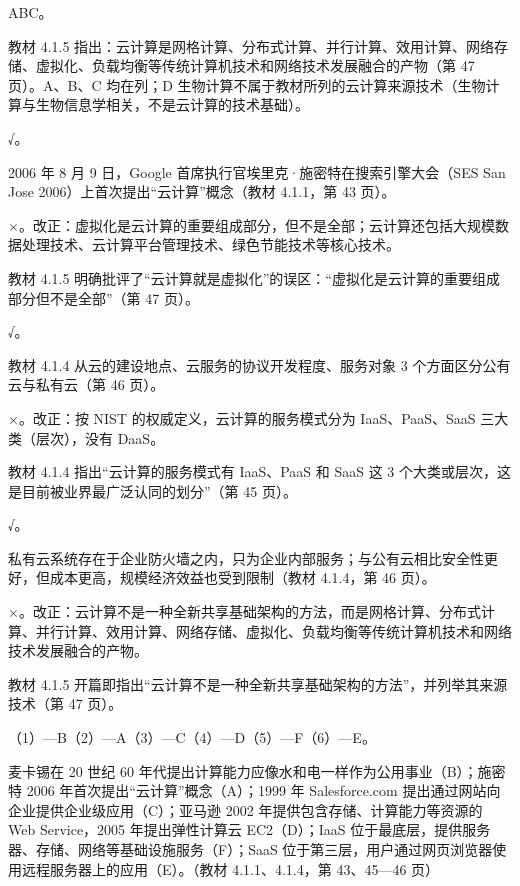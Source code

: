 \documentclass[a4paper,11pt]{article}
\begin{document}
\q ABC。\begin{analysis}教材 4.1.5 指出：云计算是网格计算、分布式计算、并行计算、效用计算、网络存储、虚拟化、负载均衡等传统计算机技术和网络技术发展融合的产物（第 47 页）。A、B、C 均在列；D 生物计算不属于教材所列的云计算来源技术（生物计算与生物信息学相关，不是云计算的技术基础）。\end{analysis}


\q √。\begin{analysis}2006 年 8 月 9 日，Google 首席执行官埃里克·施密特在搜索引擎大会（SES San Jose 2006）上首次提出“云计算”概念（教材 4.1.1，第 43 页）。\end{analysis}

\q ×。改正：虚拟化是云计算的重要组成部分，但不是全部；云计算还包括大规模数据处理技术、云计算平台管理技术、绿色节能技术等核心技术。\begin{analysis}教材 4.1.5 明确批评了“云计算就是虚拟化”的误区：“虚拟化是云计算的重要组成部分但不是全部”（第 47 页）。\end{analysis}

\q √。\begin{analysis}教材 4.1.4 从云的建设地点、云服务的协议开发程度、服务对象 3 个方面区分公有云与私有云（第 46 页）。\end{analysis}

\q ×。改正：按 NIST 的权威定义，云计算的服务模式分为 IaaS、PaaS、SaaS 三大类（层次），没有 DaaS。\begin{analysis}教材 4.1.4 指出“云计算的服务模式有 IaaS、PaaS 和 SaaS 这 3 个大类或层次，这是目前被业界最广泛认同的划分”（第 45 页）。\end{analysis}

\q √。\begin{analysis}私有云系统存在于企业防火墙之内，只为企业内部服务；与公有云相比安全性更好，但成本更高，规模经济效益也受到限制（教材 4.1.4，第 46 页）。\end{analysis}

\q ×。改正：云计算不是一种全新共享基础架构的方法，而是网格计算、分布式计算、并行计算、效用计算、网络存储、虚拟化、负载均衡等传统计算机技术和网络技术发展融合的产物。\begin{analysis}教材 4.1.5 开篇即指出“云计算不是一种全新共享基础架构的方法”，并列举其来源技术（第 47 页）。\end{analysis}


\q （1）—B\quad （2）—A\quad （3）—C\quad （4）—D\quad （5）—F\quad （6）—E。
\begin{analysis}麦卡锡在 20 世纪 60 年代提出计算能力应像水和电一样作为公用事业（B）；施密特 2006 年首次提出“云计算”概念（A）；1999 年 Salesforce.com 提出通过网站向企业提供企业级应用（C）；亚马逊 2002 年提供包含存储、计算能力等资源的 Web Service，2005 年提出弹性计算云 EC2（D）；IaaS 位于最底层，提供服务器、存储、网络等基础设施服务（F）；SaaS 位于第三层，用户通过网页浏览器使用远程服务器上的应用（E）。（教材 4.1.1、4.1.4，第 43、45—46 页）\end{analysis}
\end{document}
